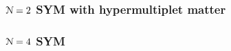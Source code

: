 \documentclass[10pt, oneside]{article}
\begin{document}
%
%
%


\subsubsection{$\mathcal N=2$ SYM with hypermultiplet matter}

\subsubsection{$\mathcal N=4$ SYM}
\end{document}
